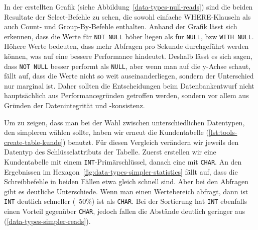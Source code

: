 In der erstellten Grafik (siehe Abbildung~\ref{data-types-null-reads}) sind die beiden Resultate der Select-Befehle zu sehen, die sowohl einfache WHERE-Klauseln als auch Count- und Group-By-Befehle enthalten.
Anhand der Grafik lässt sich erkennen, dass die Werte für \texttt{NOT NULL} höher liegen als für \texttt{NULL}, bzw \texttt{WITH NULL}.
Höhere Werte bedeuten, dass mehr Abfragen pro Sekunde durchgeführt werden können, was auf eine bessere Performance hindeutet.
Deshalb lässt es sich sagen, dass \texttt{NOT NULL} besser performt als \texttt{NULL}, aber wenn man auf die y-Achse schaut, fällt auf, dass die Werte nicht so weit auseinanderliegen, sondern der Unterschied nur marginal ist.
Daher sollten die Entscheidungen beim Datenbankentwurf nicht hauptsächlich aus Performancegründen getroffen werden, sondern vor allem aus Gründen der Datenintegrität und -konsistenz.

Um zu zeigen, dass man bei der Wahl zwischen unterschiedlichen Datentypen, den simpleren wählen sollte, haben wir erneut die Kundentabelle (\ref{lst:tools-create-table-kunde}) benutzt.
Für diesen Vergleich verändern wir jeweils den Datentyp des Schlüsselattributs der Tabelle.
Zuerst erstellen wir eine Kundentabelle mit einem \texttt{INT}-Primärschlüssel, danach eine mit \texttt{CHAR}.
An den Ergebnissen im Hexagon~\ref{fig:data-types-simpler-statistics} fällt auf, dass die Schreibbefehle in beiden Fällen etwa gleich schnell sind.
Aber bei den Abfragen gibt es deutliche Unterschiede.
Wenn man einen Wertebereich abfragt, dann ist \texttt{INT} deutlich schneller (~50\%) ist als \texttt{CHAR}.
Bei der Sortierung hat \texttt{INT} ebenfalls einen Vorteil gegenüber \texttt{CHAR}, jedoch fallen die Abstände deutlich geringer aus (\ref{data-types-simpler-reads}).


